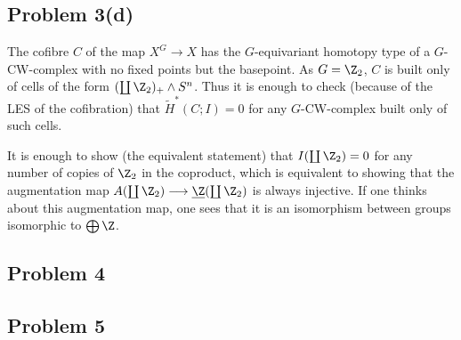 \documentclass[11pt]{article}
\begin{document}
\subsection*{Problem 3(d)}
The cofibre $C$ of the map $X^G\to X$ has the $G$-equivariant homotopy type of a $G$-CW-complex with no fixed points but the basepoint. As $G=\Z_2$, $C$ is built only of cells of the form $(\coprod\Z_2)_+\wedge S^n$. Thus it is enough to check (because of the LES of the cofibration) that $\widetilde H^*(C;I)=0$ for any $G$-CW-complex built only of such cells.

It is enough to show (the equivalent statement) that $I(\coprod\Z_2)=0$ for any number of copies of $\Z_2$ in the coproduct, which is equivalent to showing that the augmentation map $A(\coprod\Z_2)\to\underline\Z(\coprod\Z_2)$ is always injective. If one thinks about this augmentation map, one sees that it is an isomorphism between groups isomorphic to $\bigoplus\Z$.


\subsection*{Problem 4}
\subsection*{Problem 5}
\end{document}
